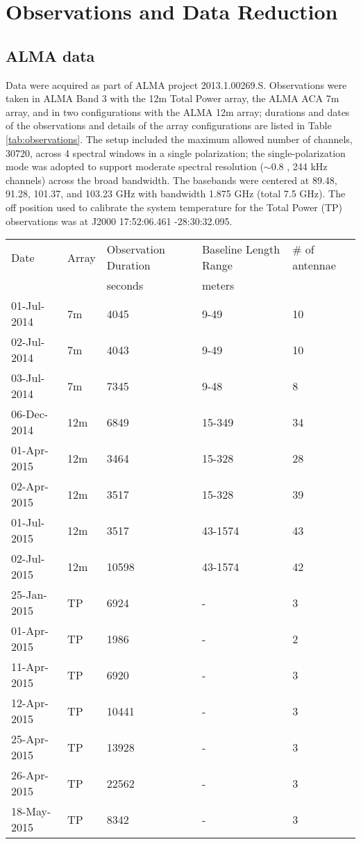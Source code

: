 \documentclass[twocolumn]{aastex61}
\begin{document}
\section{Observations and Data Reduction}
\label{sec:observations}
\subsection{ALMA data}
Data were acquired as part of ALMA project 2013.1.00269.S.  Observations were
taken in ALMA Band 3 with the 12m Total Power array, the ALMA ACA 7m array, and
in two configurations with the ALMA 12m array; durations and dates of the
observations and details of the array configurations are listed in Table
\ref{tab:observations}.  The setup included the maximum allowed number of
channels, 30720, across 4 spectral windows in a single polarization; the
single-polarization mode was adopted to support moderate spectral resolution
($\sim0.8$ \kms, 244 kHz channels) across the broad bandwidth.  The basebands
were centered at 89.48, 91.28, 101.37, and 103.23 GHz with bandwidth 1.875 GHz
(total 7.5 GHz).  The off position used to calibrate the system temperature for
the Total Power (TP) observations was at J2000 17:52:06.461
-28:30:32.095.


\begin{table*}[htp]
\centering
\caption{Observation Summary}
\begin{tabular}{lllll}
\label{tab:observations}
Date & Array & Observation Duration &  Baseline Length Range  & \# of antennae\\
     &       & seconds              & meters                    & \\
\hline
01-Jul-2014 & 7m & 4045 & 9-49 & 10\\
02-Jul-2014 & 7m & 4043 & 9-49 & 10\\
03-Jul-2014 & 7m & 7345 & 9-48 & 8\\
06-Dec-2014 & 12m & 6849 & 15-349 & 34\\
01-Apr-2015 & 12m & 3464 & 15-328 & 28\\
02-Apr-2015 & 12m & 3517 & 15-328 & 39\\
01-Jul-2015 & 12m & 3517 & 43-1574 & 43\\
02-Jul-2015 & 12m & 10598 & 43-1574 & 42\\

\hline

25-Jan-2015 & TP & 6924  & - & 3\\
01-Apr-2015 & TP & 1986  & - & 2\\
11-Apr-2015 & TP & 6920  & - & 3\\
12-Apr-2015 & TP & 10441 & - & 3\\
25-Apr-2015 & TP & 13928 & - & 3\\
26-Apr-2015 & TP & 22562 & - & 3\\
18-May-2015 & TP & 8342  & - & 3\\
\hline
\end{tabular}
\end{table*}
\end{document}
